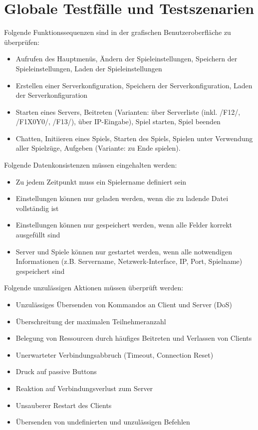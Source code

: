 \documentclass[a4paper,10pt]{article}
\begin{document}
\section{Globale Testfälle und Testszenarien}
Folgende Funktionssequenzen sind in der grafischen Benutzeroberfläche zu überprüfen:
\begin{itemize}
\item Aufrufen des Hauptmenüs, Ändern der Spieleinstellungen, Speichern der Spieleinstellungen, Laden der Spieleinstellungen
\item Erstellen einer Serverkonfiguration, Speichern der Serverkonfiguration, Laden der Serverkonfiguration
\item Starten eines Servers, Beitreten (Varianten: über Serverliste (inkl. /F12/, /F1X0Y0/, /F13/), über IP-Eingabe), Spiel starten, Spiel beenden
\item Chatten, Initiieren eines Spiels, Starten des Spiels, Spielen unter Verwendung aller Spielzüge, Aufgeben (Variante: zu Ende spielen).
\end{itemize}
Folgende Datenkonsistenzen müssen eingehalten werden:
\begin{itemize}
\item Zu jedem Zeitpunkt muss ein Spielername definiert sein
\item Einstellungen können nur geladen werden, wenn die zu ladende Datei vollständig ist
\item Einstellungen können nur gespeichert werden, wenn alle Felder korrekt ausgefüllt sind
\item Server und Spiele können nur gestartet werden, wenn alle notwendigen Informationen (z.B. Servername, Netzwerk-Interface, IP, Port, Spielname) gespeichert sind
\end{itemize}
Folgende unzulässigen Aktionen müssen überprüft werden:
\begin{itemize}
\item Unzulässiges Übersenden von Kommandos an Client und Server (DoS)
\item Überschreitung der maximalen Teilnehmeranzahl
\item Belegung von Ressourcen durch häufiges Beitreten und Verlassen von Clients
\item Unerwarteter Verbindungsabbruch (Timeout, Connection Reset)
\item Druck auf passive Buttons
\item Reaktion auf Verbindungsverlust zum Server
\item Unsauberer Restart des Clients
\item Übersenden von undefinierten und unzulässigen Befehlen
\end{itemize}
\end{document}
